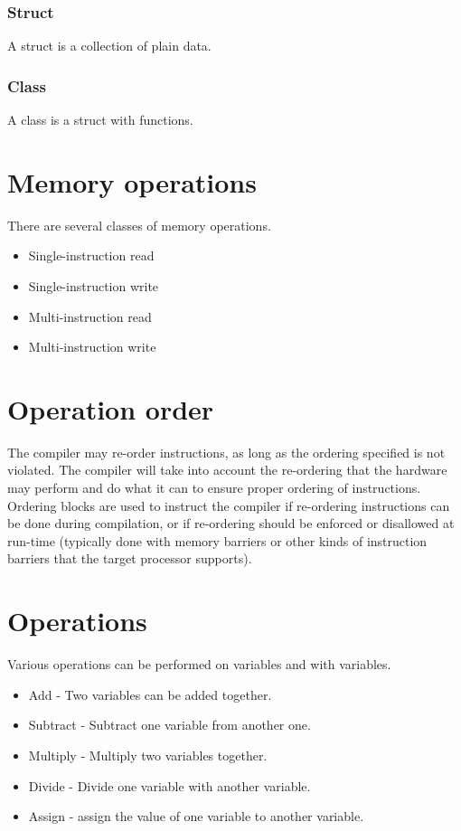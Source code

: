 \documentclass[12pt]{article}
\begin{document}
\subsubsection {Struct}
A struct is a collection of plain data.

\subsubsection {Class}
A class is a struct with functions.

\section { Memory operations }
There are several classes of memory operations.
\begin{itemize}
\item Single-instruction read
\item Single-instruction write
\item Multi-instruction read
\item Multi-instruction write
\end{itemize}

\section {Operation order}
The compiler may re-order instructions, as long as the ordering specified is not violated. 
The compiler will take into account the re-ordering that the hardware may perform and do what it can to ensure proper
ordering of instructions.
Ordering blocks are used to instruct the compiler if re-ordering instructions can be done during compilation, or if re-ordering should be enforced or disallowed at run-time (typically done with memory barriers or other kinds of instruction barriers that the target processor supports).

\section { Operations }
Various operations can be performed on variables and with variables.
\begin{itemize}
\item Add - Two variables can be added together.
\item Subtract - Subtract one variable from another one.
\item Multiply - Multiply two variables together.
\item Divide - Divide one variable with another variable.
\item Assign - assign the value of one variable to another variable.
\end{itemize}
\end{document}
